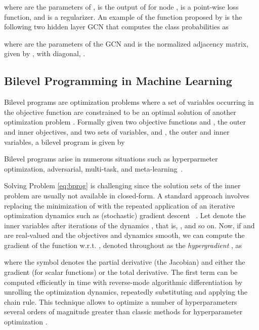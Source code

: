 \documentclass{article}
\begin{document}
	where  are the parameters of ,  is the output of  for node ,  is a point-wise loss function, and  is a regularizer.
	An example of the function  proposed by \citet{kipf2016semi} is the following two hidden layer GCN that computes the class probabilities as 

where  are the parameters of the GCN and  is the normalized adjacency matrix, given by  , with diagonal, .
	
	\subsection{Bilevel Programming in Machine Learning} \label{sec:bk:hpo}
	
Bilevel programs are optimization problems where a set of variables occurring in the objective function are constrained
to be an optimal 
solution of another optimization problem \citep[see][for an overwiew]{colson2007overview}. Formally
given two objective functions  and , the outer and inner objectives, and two sets of variables,  and , the outer and inner variables, a bilevel program is given by

Bilevel programs arise in numerous situations such as  hyperparmeter optimization, adversarial, multi-task, and meta-learning~\citep{bennett2006model, flamary2014learning, munoz2017towards, franceschi2018bilevel}. 


Solving Problem \eqref{eq:bprog} is challenging since the solution sets of the inner problem are usually not available in closed-form. A standard approach
involves replacing the minimization of  with the repeated application of an iterative optimization dynamics 
 such as (stochastic) gradient descent~ \citep{domke2012generic, maclaurin2015gradient, franceschi2017forward}. 
Let  denote the inner variables after  iterations of the dynamics , that is, , and so on.
Now, if  and  are real-valued and the objectives and dynamics smooth, we can compute the gradient of the function  w.r.t. , 
denoted throughout as the \emph{hypergradient} , as

where the symbol  denotes the partial derivative (the Jacobian) and  either the gradient (for scalar functions) or the total derivative. The first term 
can be computed efficiently in time   with reverse-mode algorithmic differentiation \citep{griewank2008evaluating} by unrolling the optimization dynamics, repeatedly substituting  and applying the chain rule.
This technique allows 
to optimize a number of hyperparameters several orders of magnitude greater than classic methods for hyperparameter optimization \citep{feurer2018hyperparameter}.
\end{document}

